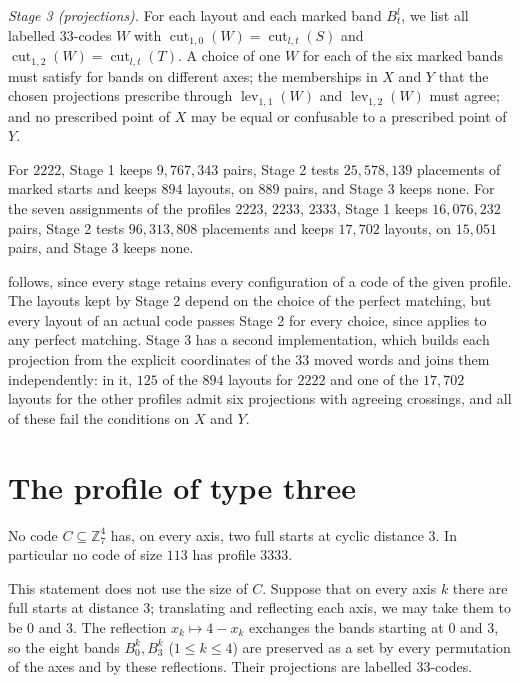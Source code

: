 \documentclass[11pt,colorlinks]{charlie}
\newcommand{\Zs}{\mathbb{Z}_7}
\newcommand{\cut}{\operatorname{cut}}
\newcommand{\lev}{\operatorname{lev}}
\begin{document}
\emph{Stage 3 (projections).} For each layout and each marked band $B^l_t$, we list all labelled $33$-codes $W$ with $\cut_{1,0}(W)=\cut_{l,t}(S)$ and $\cut_{1,2}(W)=\cut_{l,t}(T)$. A choice of one $W$ for each of the six marked bands must satisfy  for bands on different axes; the memberships in $X$ and $Y$ that the chosen projections prescribe through $\lev_{1,1}(W)$ and $\lev_{1,2}(W)$ must agree; and no prescribed point of $X$ may be equal or confusable to a prescribed point of $Y$.

\begin{lemma}\label{lem:gaptwo}
For $2222$, Stage 1 keeps $9{,}767{,}343$ pairs, Stage 2 tests $25{,}578{,}139$ placements of marked starts and keeps $894$ layouts, on $889$ pairs, and Stage 3 keeps none. For the seven assignments of the profiles $2223$, $2233$, $2333$, Stage 1 keeps $16{,}076{,}232$ pairs, Stage 2 tests $96{,}313{,}808$ placements and keeps $17{,}702$ layouts, on $15{,}051$ pairs, and Stage 3 keeps none.
\end{lemma}

 follows, since every stage retains every configuration of a code of the given profile. The layouts kept by Stage 2 depend on the choice of the perfect matching, but every layout of an actual code passes Stage 2 for every choice, since  applies to any perfect matching. Stage 3 has a second implementation, which builds each projection from the explicit coordinates of the $33$ moved words and joins them independently: in it, $125$ of the $894$ layouts for $2222$ and one of the $17{,}702$ layouts for the other profiles admit six projections with agreeing crossings, and all of these fail the conditions on $X$ and $Y$.

\section{The profile of type three}\label{sec:gapthree}
\begin{proposition}\label{prop:gapthree}
No code $C\subseteq\Zs^4$ has, on every axis, two full starts at cyclic distance $3$. In particular no code of size $113$ has profile $3333$.
\end{proposition}

This statement does not use the size of $C$. Suppose that on every axis $k$ there are full starts at distance $3$; translating and reflecting each axis, we may take them to be $0$ and $3$. The reflection $x_k\mapsto4-x_k$ exchanges the bands starting at $0$ and $3$, so the eight bands $B^k_0,B^k_3$ ($1\le k\le4$) are preserved as a set by every permutation of the axes and by these reflections. Their projections are labelled $33$-codes.
\end{document}

